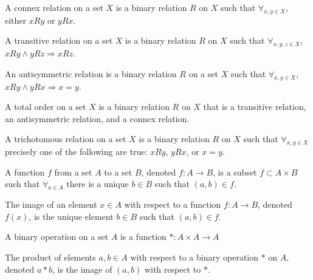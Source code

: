 \documentclass[crop=false,class=book]{standalone}
\begin{document}
\begin{definition}
    \label{Definition:MathEnc:Analysis:Sum:ConnexRelation}
    A connex relation on a set $X$ is a binary relation $R$ on $X$ such that
    $\forall_{x,y\in X}$, either $xRy$ or $yRx$.
\end{definition}
\begin{definition}
    \label{Definition:MathEnc:Analysis:Sum:TransitiveRelation}
    A transitive relation on a set $X$ is a binary relation $R$ on $X$ such
    that $\forall_{x,y,z\in X}$, $xRy\land yRz\Rightarrow xRz$.
\end{definition}
\begin{definition}
    \label{Definition:MathEnc:Analysis:Sum:AntisymmetricRelation}
    An antisymmetric relation is a binary relation $R$ on a set $X$ such
    that $\forall_{x,y\in X}$, $xRy\land yRx\Rightarrow x=y$.
\end{definition}
\begin{definition}
    \label{Definition:MathEnc:Analysis:Sum:TotalOrder}
    A total order on a set $X$ is a binary relation $R$ on $X$ that is a transitive relation, an antisymmetric relation, and a connex relation.
\end{definition}
\begin{definition}
    \label{Definition:MathEnc:Analysis:Sum:TrichotomousRelation}
    A trichotomous relation on a set $X$ is a binary relation $R$ on $X$
    such that $\forall_{x,y\in X}$ precisely one of the following are true:
    $xRy$, $yRx$, or $x=y$.
\end{definition}
\begin{definition}
    \label{Definition:MathEnc:Analysis:Sum:Function}
    A function $f$ from a set $A$ to a set $B$, denoted $f:A\rightarrow B$,
    is a subset $f\subset A\times B$ such that $\forall_{a\in A}$ there is
    a unique $b\in B$ such that $(a,b)\in f$.
\end{definition}
\begin{definition}
    \label{Definition:MathEnc:Analysis:Sum:Image}
    The image of an element $x\in A$ with respect to a function $f:A\rightarrow B$, denoted $f(x)$, is the unique element $b\in B$ such that $(a,b)\in f$.
\end{definition}
\begin{definition}
    \label{Definition:MathEnc:Analysis:Sum:BinaryOperation}
    A binary operation on a set $A$ is a function $*:A\times A\rightarrow A$
\end{definition}
\begin{definition}
    \label{Definition:MathEnc:Analysis:Sum:Product}
    The product of elements $a,b\in A$ with respect to a binary operation
    $*$ on $A$, denoted $a*b$, is the image of $(a,b)$ with respect to $*$.
\end{definition}
\end{document}
